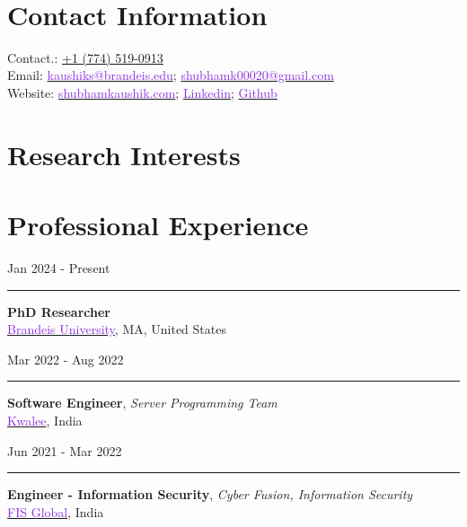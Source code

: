 \documentclass[10pt,a4paper,calibri]{moderncv}
\newcommand{\beforesection}{\vspace{-0.5em}}
\newcommand{\mediumspace}{\vspace{0.5em}}
\newcommand{\workexperience}[2]{
  \noindent
  \begin{minipage}[c]{0.20\textwidth}
    \begin{flushright}
      #1      
    \end{flushright}
  \end{minipage}%
  \hspace{0.01\textwidth}
  \begin{minipage}[c]{0.02\textwidth}
    \textcolor{lightgray}{\rule{1pt}{0.7cm}}
  \end{minipage}%
  \begin{minipage}[c]{0.80\textwidth}
    \raggedright{
    #2
    }
  \end{minipage}%
}
\begin{document}
\makecvtitle\

\vspace{-50pt}
\section{Contact Information}

Contact.: \href{tel:+17745190913}{+1 (774) 519-0913}\\
Email: \href{mailto:kaushiks@brandeis.edu}{\textcolor{blueviolet}{kaushiks@brandeis.edu}}\;; 
\href{mailto:shubhamk00020@gmail.com}{\textcolor{blueviolet}{shubhamk00020@gmail.com}}\\
Website: \href{https://www.shubhamkaushik.com}{\textcolor{blueviolet}{shubhamkaushik.com}}\;; 
\href{https://www.linkedin.com/in/shubham-sudo}{\textcolor{blueviolet}{Linkedin}}\;; 
\href{https://www.github.com/shubham-sudo}{\textcolor{blueviolet}{Github}}
\beforesection

\section{Research Interests}

\beforesection

\section{Professional Experience}
\workexperience{Jan 2024 \-- Present}{
  \textbf{PhD Researcher}\\
  \href{https://www.brandeis.edu/}{\textcolor{blueviolet}{Brandeis University}}, MA, United States\\
}

\mediumspace

\workexperience{Mar 2022 \-- Aug 2022}{
  \textbf{Software Engineer}, \textit{Server Programming Team}\\
    \href{https://www.kwalee.com/}{\textcolor{blueviolet}{Kwalee}}, India\\
}

\mediumspace

\workexperience{Jun 2021 \-- Mar 2022}{
  \textbf{Engineer \-- Information Security}, \textit{Cyber Fusion, Information Security}\\
    \href{https://www.fisglobal.com/en}{\textcolor{blueviolet}{FIS Global}}, India\\
}
\end{document}
